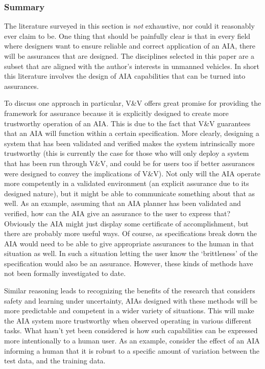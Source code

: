 \subsubsection{Summary}
    The literature surveyed in this section is \emph{not} exhaustive, nor could it reasonably ever claim to be. One thing that should be painfully clear is that in every field where designers want to ensure reliable and correct application of an AIA, there will be assurances that are designed. The disciplines selected in this paper are a subset that are aligned with the author's interests in unmanned vehicles. In short this literature involves the design of AIA capabilities that can be turned into assurances.
    
    To discuss one approach in particular, V\&V offers great promise for providing the framework for assurance because it is explicitly designed to create more trustworthy operation of an AIA. This is due to the fact that V\&V guarantees that an AIA will function within a certain specification. More clearly, designing a system that has been validated and verified makes the system intrinsically more trustworthy (this is currently the case for those who will only deploy a system that has been run through V\&V, and could be for users too if better assurances were designed to convey the implications of V\&V). Not only will the AIA operate more competently in a validated environment (an explicit assurance due to its designed nature), but it might be able to communicate something about that as well. As an example, assuming that an AIA planner has been validated and verified, how can the AIA give an assurance to the user to express that? Obviously the AIA might just display some certificate of accomplishment, but there are probably more useful ways. Of course, as specifications break down the AIA would need to be able to give appropriate assurances to the human in that situation as well. In such a situation letting the user know the `brittleness' of the specification would also be an assurance. However, these kinds of methods have not been formally investigated to date.
    
    Similar reasoning leads to recognizing the benefits of the research that considers safety and learning under uncertainty, AIAs designed with these methods will be more predictable and competent in a wider variety of situations. This will make the AIA system more trustworthy when observed operating in various different tasks. What hasn't yet been considered is how such capabilities can be expressed more intentionally to a human user. As an example, consider the effect of an AIA informing a human that it is robust to a specific amount of variation between the test data, and the training data.

